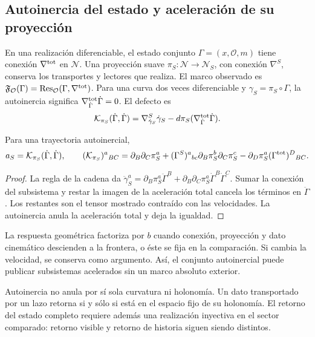\subsection{Autoinercia del estado y aceleración de su proyección}
\label{hmtcuatro:gea:proyeccion}

En una realización diferenciable, el estado conjunto
$\Gamma=(x,\mathcal O,m)$ tiene conexión $\nabla^{\rm tot}$
en $\mathcal N$. Una proyección suave
$\pi_S:\mathcal N\to\mathcal N_S$, con conexión $\nabla^S$,
conserva los transportes y lectores que realiza.
El marco observado es
$\mathfrak F_{\mathcal O}(\Gamma)
=\operatorname{Res}_{\mathcal O}(\Gamma,\nabla^{\rm tot})$.
Para una curva dos veces diferenciable y
$\gamma_S=\pi_S\circ\Gamma$, la autoinercia significa
$\nabla^{\rm tot}_{\dot\Gamma}\dot\Gamma=0$.
El defecto es
\[
\mathcal K_{\pi_S}(\dot\Gamma,\dot\Gamma)
=\nabla^S_{\dot\gamma_S}\dot\gamma_S
-d\pi_S(\nabla^{\rm tot}_{\dot\Gamma}\dot\Gamma).
\]
\begin{proposition}
\label{hmtcuatro:gea:aceleracion}
Para una trayectoria autoinercial,
\begin{equation}
a_S=\mathcal K_{\pi_S}(\dot\Gamma,\dot\Gamma),\qquad
(\mathcal K_{\pi_S})^a{}_{BC}
=\partial_B\partial_C\pi_S^a
+(\Gamma^S)^a{}_{bc}\partial_B\pi_S^b\partial_C\pi_S^c
-\partial_D\pi_S^a(\Gamma^{\rm tot})^D{}_{BC}.
\label{hmtcuatro:gea:defecto}
\end{equation}
\end{proposition}
\begin{proof}
La regla de la cadena da
$\ddot\gamma_S^a=\partial_B\pi_S^a\ddot\Gamma^B
+\partial_B\partial_C\pi_S^a\dot\Gamma^B\dot\Gamma^C$.
Sumar la conexión del subsistema y restar la imagen de la
aceleración total cancela los términos en $\ddot\Gamma$.
Los restantes son el tensor mostrado contraído con las velocidades.
La autoinercia anula la aceleración total y deja la igualdad.
\end{proof}
La respuesta geométrica factoriza por $b$ cuando conexión,
proyección y dato cinemático descienden a la frontera, o éste
se fija en la comparación. Si cambia la velocidad, se conserva
como argumento. Así, el conjunto autoinercial puede publicar
subsistemas acelerados sin un marco absoluto exterior.

Autoinercia no anula por sí sola curvatura ni holonomía.
Un dato transportado por un lazo retorna si y sólo si está en
el espacio fijo de su holonomía. El retorno del estado completo
requiere además una realización inyectiva en el sector comparado:
retorno visible y retorno de historia siguen siendo distintos.

